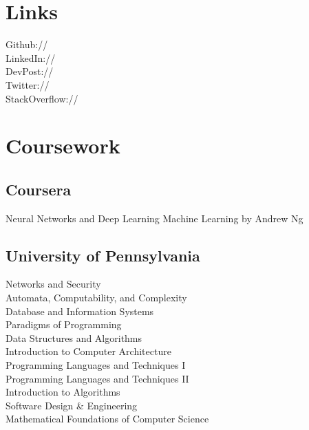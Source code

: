 \documentclass[]{deedy-resume-openfont}
\begin{document}
\begin{minipage}[t]{0.34\textwidth}

\section{Links} 
Github:// \href{https://github.com/soyoungpark}{} \\
LinkedIn://  \href{https://www.linkedin.com/in/soyoungpark05}{} \\
DevPost://  \href{http://devpost.com/soyoungpark}{} \\
Twitter://  \href{https://twitter.com/soyoung_park}{} \\
StackOverflow://  \href{http://stackoverflow.com/users/3645789/ampersands}{}
\sectionsep


\section{Coursework}
\vspace{\topsep} %
\subsection{Coursera}
Neural Networks and Deep Learning
Machine Learning by Andrew Ng
\vspace{\topsep} %
\subsection{University of Pennsylvania}
Networks and Security \\
Automata, Computability, and Complexity\\
Database and Information Systems \\
Paradigms of Programming\\
Data Structures and Algorithms \\
Introduction to Computer Architecture \\
Programming Languages and Techniques I\\
Programming Languages and Techniques II\\
Introduction to Algorithms\\
Software Design \& Engineering\\
Mathematical Foundations of Computer Science\\
\sectionsep

%
%

\end{minipage} 
\end{document}

